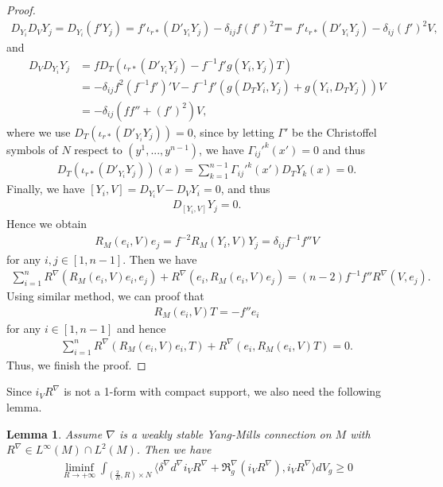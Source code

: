 \documentclass{amsart}
\newtheorem{lemma}{Lemma}[section]
\begin{document}
\begin{proof}
		\begin{align*}
			D_{Y_i}D_VY_j=D_{Y_i}(f'Y_j)=f'\iota_{r\ast}(D'_{Y_i}Y_j)-\delta_{ij}f(f')^2T=f'\iota_{r\ast}(D'_{Y_i}Y_j)-\delta_{ij}(f')^2V,
		\end{align*}
		and
		\begin{align*}
			D_VD_{Y_i}Y_j&=fD_T(\iota_{r\ast}(D'_{Y_i}Y_j)-f^{-1}f'g(Y_i,Y_j)T)\\
			&=-\delta_{ij}f^2(f^{-1}f')'V-f^{-1}f'(g(D_TY_i,Y_j)+g(Y_i,D_TY_j))V\\
			&=-\delta_{ij}(ff''+(f')^2)V,
		\end{align*}
		where we use $D_T(\iota_{r\ast}(D'_{Y_i}Y_j))=0$, since by letting $\Gamma'$ be the Christoffel symbols of $N$ respect to $(y^1,...,y^{n-1})$, we have $\Gamma_{ij}'^k(x')=0$ and thus
		\begin{align*}
			D_T(\iota_{r\ast}(D'_{Y_i}Y_j))(x)=\sum_{k=1}^{n-1}\Gamma_{ij}'^k(x')D_TY_k(x)=0.
		\end{align*}
		Finally, we have $[Y_i,V]=D_{Y_i}V-D_VY_i=0$, and thus
		\begin{align*}
			D_{[Y_i,V]}Y_j=0.
		\end{align*}
		Hence we obtain
		\begin{align*}
			R_M(e_i,V)e_j=f^{-2}R_M(Y_i,V)Y_j=\delta_{ij}f^{-1}f''V
		\end{align*}
		for any $i,j\in[1,n-1]$. Then we have
		\begin{align*}
			\sum_{i=1}^nR^\nabla(R_M(e_i,V)e_i,e_j)+R^\nabla(e_i,R_M(e_i,V)e_j)=(n-2)f^{-1}f''R^\nabla(V,e_j).
		\end{align*}
		Using similar method, we can proof that
		\begin{align*}
			R_M(e_i,V)T=-f''e_i
		\end{align*}
		for any $i\in[1,n-1]$ and hence
		\begin{align*}
			\sum_{i=1}^nR^\nabla(R_M(e_i,V)e_i,T)+R^\nabla(e_i,R_M(e_i,V)T)=0.
		\end{align*}
		Thus, we finish the proof.
	\end{proof}
	Since $i_VR^\nabla$ is not a 1-form with compact support, we also need the following lemma.
	\begin{lemma}\label{energy limit}
		Assume $\nabla$ is a weakly stable Yang-Mills connection on $M$ with $R^\nabla\in L^\infty(M)\cap L^2(M)$. Then we have
		\begin{align*}
			\liminf_{R\to+\infty}\int_{(\frac2R,R)\times N}\langle \delta^\nabla d^\nabla i_VR^\nabla+\mathfrak{R}_g^\nabla(i_VR^\nabla),i_VR^\nabla\rangle dV_g\ge0
		\end{align*}
	\end{lemma}
\end{document}
